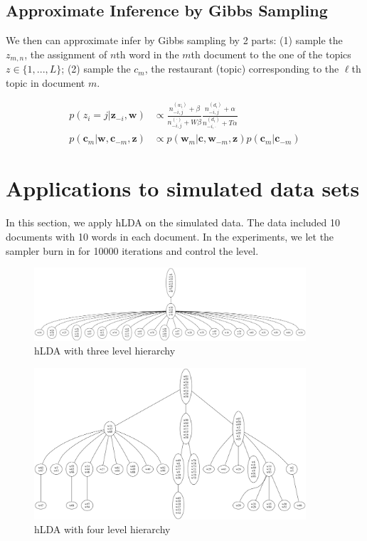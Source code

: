\documentclass[a4paper]{article}
\begin{document}
\subsection{Approximate Inference by Gibbs Sampling}
We then can approximate infer by Gibbs sampling by 2 parts: (1) sample the $z_{m,n}$, the assignment of $n$th word in the $m$th document to the one of the topics $z\in\{1,...,L\}$\cite{Griffiths_Steyvers_2002}; (2) sample the $c_{m}$, the restaurant (topic) corresponding to the $\ell$th topic in document $m$.


\begin{align}
p(z_{i}=j|\mathbf{z}_{-i},\mathbf{w})&\propto\frac{n_{-i,j}^{(w_{i})}+\beta}{n_{-i,j}^{(\cdot)}+W\beta}\frac{n_{-i,j}^{(d_{i})}+\alpha}{n_{-i,\cdot}^{(d_{i})}+T\alpha}\\
p(\mathbf{c}_{m}|\mathbf{w},\mathbf{c}_{-m},\mathbf{z})&\propto p(\mathbf{w}_{m}|\mathbf{c},\mathbf{w}_{-m},\mathbf{z})p(\mathbf{c}_{m}|\mathbf{c}_{-m})
\end{align}


\section{Applications to simulated data sets}

In this section, we apply hLDA on the simulated data. The data included 10 documents with 10 words in each document.  In the experiments, we let the sampler burn in for 10000 iterations and control the level. 

\begin{figure}
\center
\includegraphics[width=0.9\textwidth]{sim.png}
\caption{ hLDA with three level hierarchy}
\label{fig:h1}
\end{figure}


\begin{figure}
\center
\includegraphics[width=0.9\textwidth]{sim2.png}
\caption{ hLDA with four level hierarchy}
\label{fig:h1}
\end{figure}


\newpage


\end{document}
